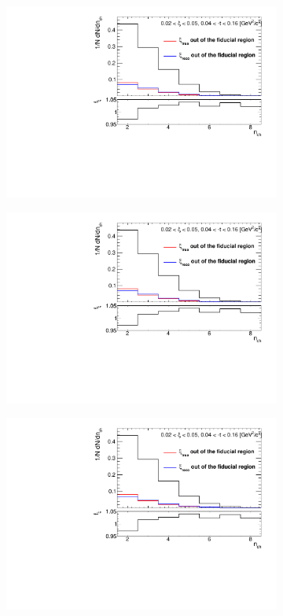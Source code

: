 \begin{figure}[h!]	
	\begin{subfigure}{.49\textwidth}
		\includegraphics[width=\textwidth,page=7]{chapters/chrgSTAR/img/xiMigration/xi.pdf}
	\end{subfigure}
	\hfill
	\begin{subfigure}{.49\textwidth}
		\includegraphics[width=\textwidth,page=8]{chapters/chrgSTAR/img/xiMigration/xi.pdf}
	\end{subfigure}
	\begin{subfigure}{.49\textwidth}
		\includegraphics[width=\textwidth,page=9]{chapters/chrgSTAR/img/xiMigration/xi.pdf}

\end{subfigure}
\end{figure}
